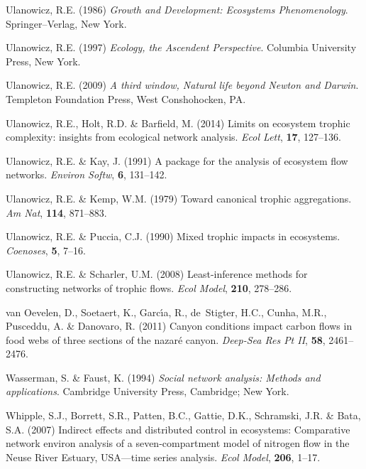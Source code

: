 \documentclass[11pt]{article}
\begin{document}
\begin{thebibliography}{75}
Ulanowicz, R.E. (1986) \emph{Growth and Development: Ecosystems Phenomenology}.
\newblock Springer--Verlag, New York.

Ulanowicz, R.E. (1997) \emph{Ecology, the Ascendent Perspective}.
\newblock Columbia University Press, New York.

Ulanowicz, R.E. (2009) \emph{A third window, {N}atural life beyond {N}ewton and
  {D}arwin}.
\newblock Templeton Foundation Press, West Conshohocken, PA.

Ulanowicz, R.E., Holt, R.D. \& Barfield, M. (2014) Limits on ecosystem trophic
  complexity: insights from ecological network analysis.
\newblock \emph{Ecol Lett}, \textbf{17}, 127--136.

Ulanowicz, R.E. \& Kay, J. (1991) A package for the analysis of ecosystem flow
  networks.
\newblock \emph{Environ Softw}, \textbf{6}, 131--142.

Ulanowicz, R.E. \& Kemp, W.M. (1979) Toward canonical trophic aggregations.
\newblock \emph{Am Nat}, \textbf{114}, 871--883.

Ulanowicz, R.E. \& Puccia, C.J. (1990) Mixed trophic impacts in ecosystems.
\newblock \emph{Coenoses}, \textbf{5}, 7--16.

Ulanowicz, R.E. \& Scharler, U.M. (2008) Least-inference methods for
  constructing networks of trophic flows.
\newblock \emph{Ecol Model}, \textbf{210}, 278--286.

van Oevelen, D., Soetaert, K., Garc{\'\i}a, R., de~Stigter, H.C., Cunha, M.R.,
  Pusceddu, A. \& Danovaro, R. (2011) Canyon conditions impact carbon flows in
  food webs of three sections of the nazar{\'e} canyon.
\newblock \emph{Deep-Sea Res Pt II}, \textbf{58}, 2461--2476.

Wasserman, S. \& Faust, K. (1994) \emph{Social network analysis: {M}ethods and
  applications}.
\newblock Cambridge University Press, Cambridge; New York.

Whipple, S.J., Borrett, S.R., Patten, B.C., Gattie, D.K., Schramski, J.R. \&
  Bata, S.A. (2007) Indirect effects and distributed control in ecosystems:
  Comparative network environ analysis of a seven-compartment model of nitrogen
  flow in the {Neuse River Estuary, USA}---time series analysis.
\newblock \emph{Ecol Model}, \textbf{206}, 1--17.


\end{thebibliography}
\end{document}
